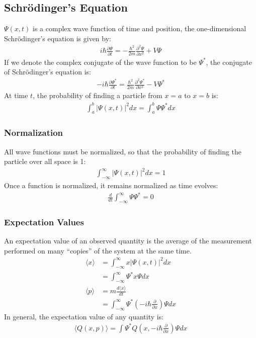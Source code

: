 \documentclass[11pt, letterpaper]{article}
\newcommand{\cc}[1]{
  \ensuremath{#1^{\ast}}}               %
\newcommand{\pd}[2]{
  \ensuremath{
    \frac{\partial #1}{\partial #2} }} %
\begin{document}
\begin{multicols*}{3}
\subsection{Schr\"{o}dinger's Equation}
$\Psi(x, t)$ is a complex wave function of time and position, the one-dimensional Schr\"{o}dinger's equation is given by:
\begin{align*}
  i \hbar \pd{\Psi}{t} = - \frac{\hbar^2}{2m} \pd{^2 \Psi}{x^2} + V\Psi
\end{align*}
If we denote the complex conjugate of the wave function to be $\cc{\Psi}$, the conjugate of Schr\"{o}dinger's equation is:
\begin{align*}
  -i \hbar \pd{\cc{\Psi}}{t} = \frac{\hbar^2}{2m} \pd{^2 \cc{\Psi}}{x^2} - V\cc{\Psi}
\end{align*}
At time $t$, the probability of finding a particle from $x=a$ to $x=b$ is:
\begin{align*}
  \int_{a}^{b} |\Psi(x, t)|^2 dx = \int_{a}^{b}\Psi\cc{\Psi}dx
\end{align*}
\subsubsection{Normalization}
All wave functions must be normalized, so that the probability of finding the particle over all space is 1:
\begin{align*}
  \int_{-\infty}^{\infty} |\Psi(x,t)|^2 dx = 1
\end{align*}
Once a function is normalized, it remains normalized as time evolves:
\begin{align*}
  \frac{d}{dt} \int_{-\infty}^{\infty} \Psi \cc{\Psi} = 0
\end{align*}
\subsubsection{Expectation Values}
An expectation value of an observed quantity is the average of the measurement performed on many ``copies'' of the system at the same time.
\begin{align*}
  \langle x\rangle &= \int_{-\infty}^{\infty} x |\Psi(x,t)|^2 dx \\
  &= \int_{-\infty}^{\infty} \cc{\Psi} x \Psi dx \\
  \langle p\rangle &= m\frac{d\langle x\rangle}{dt} \\
  &= \int_{-\infty}^{\infty} \cc{\Psi} \left( -i\hbar \pd{}{x} \right) \Psi dx
\end{align*}
In general, the expectation value of any quantity is:
\begin{align*}
  \langle Q(x, p) \rangle = \int \cc{\Psi} Q\left(x, -i\hbar\pd{}{x} \right) \Psi dx
\end{align*}


\end{multicols*}
\end{document}
